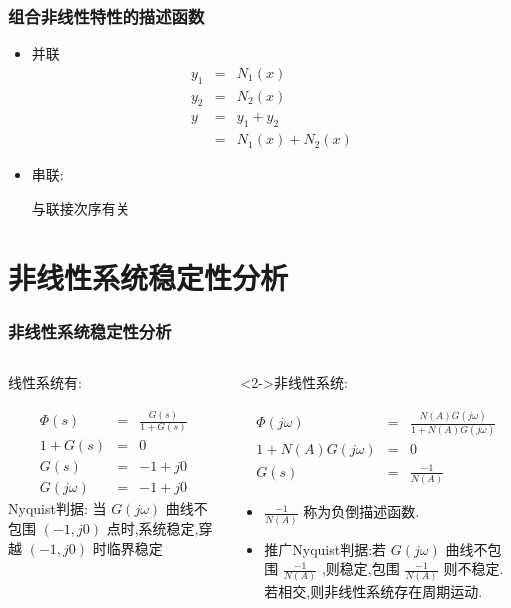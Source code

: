 \documentclass[table]{beamer}
\begin{document}
\begin{frame}
\frametitle{组合非线性特性的描述函数}
\label{sec-2-6}

\begin{itemize}
\item 并联
     \begin{eqnarray*}
     y_1 & = & N_1(x)\\
     y_2 &=& N_2(x) \\
     y &=& y_1+y_2 \\
       &=& N_1(x)+N_2(x)
     \end{eqnarray*}
\item <2->串联:

     与联接次序有关
\end{itemize}
\end{frame}
\section{非线性系统稳定性分析}
\label{sec-3}
\begin{frame}
\frametitle{非线性系统稳定性分析}
\label{sec-3-1}
\begin{columns}
\begin{column}{0.45\textwidth}
\begin{block}{线性系统有:}
\label{sec-3-1-1}

     \begin{eqnarray*}
     \Phi(s) &=& \frac{G(s)}{1+G(s)} \\
     1+G(s) &=& 0 \\
     G(s) &=& -1+j0 \\
     G(j\omega) &=& -1+j0
     \end{eqnarray*}
     Nyquist判据: 当  $G(j\omega)$ 曲线不包围 $(-1,j0)$ 点时,系统稳定,穿越 $(-1,j0)$ 时临界稳定
\end{block}
\end{column}
\begin{column}{0.55\textwidth}
\begin{block}<2->{非线性系统:}
\label{sec-3-1-2}

     \begin{eqnarray*}
     \Phi(j\omega) &=& \frac{N(A)G(j\omega)}{1+N(A)G(j\omega)} \\
     1+N(A)G(j\omega) &=& 0 \\
     G(s) &=& \frac{-1}{N(A)} 
     \end{eqnarray*}
\begin{itemize}
\item $\frac{-1}{N(A)}$ 称为负倒描述函数.
\item <3-> 推广Nyquist判据:若  $G(j\omega)$  曲线不包围  $\frac{-1}{N(A)}$ ,则稳定,包围  $\frac{-1}{N(A)}$  则不稳定.若相交,则非线性系统存在周期运动.
\end{itemize}
\end{block}
\end{column}
\end{columns}
\end{frame}
\end{document}
